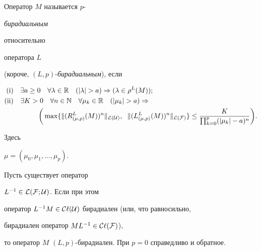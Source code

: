 \begin{defns} Оператор $M$ называется $p$-{\it бирадиальным


относительно} оператора $L$


(короче, $(L,p)$-{\it бирадиальным}), если


\begin{align*}


\text{(i}&) \quad \exists a\ge 0 \quad \forall \lambda \in {\Bbb R}


 \quad (|\lambda | >a)


\Rightarrow (\lambda\in \rho^L (M));\\


%


\text{(ii}&) \quad \exists K>0 \quad \forall n \in {\Bbb N}


\quad \forall \mu_k \in {\Bbb R} \quad


(| \mu_k |>a) \Rightarrow \\


%


&\qquad\qquad


\bigg(\max \{ \| (R^L_{(\mu ,p)} (M))^n \|_{\cal L({\cal U})},


\ \; \| (L^


L_{(\mu ,p)} (M))^n \|_{\cal L(\cal F)} \}


\le \frac{K}{\prod^p_{k=0}


(|\mu_k |-a)^n}\bigg).


\end{align*}


Здесь


$\mu=(\mu_0,\mu_1,\dotsc,\mu_p)$.


\end{defns}





\begin{notes} Пусть существует оператор


$L^{-1}\in {\cal L (\cal F;\cal U)}$. Если при этом


оператор $L^{-1}M\in {\cal C \ell(\cal U)}$ бирадиален (или, что равносильно,


бирадиален оператор $ML^{-1}\in {\cal C \ell(\cal F)}$),


то оператор $M$\; $(L,p)$-бирадиален. При $p=0$ справедливо и обратное.


\end{notes}





